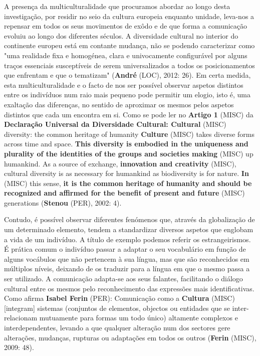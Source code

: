 \documentclass[12pt,a4paper]{article}
\begin{document}
A  presença  da  multiculturalidade  que  procuramos  abordar  ao  longo  desta investigação,  por  residir  no  seio  da  cultura  europeia  enquanto  unidade,  leva-nos  a repensar em todos os seus movimentos de exôdo e de que forma a comunicação evoluiu ao longo dos diferentes séculos. A diversidade cultural no interior do continente europeu está  em  contante  mudança,  não  se  podendo  caracterizar  como  "uma  realidade  fixa  e homogénea, clara e univocamente configurável por alguns traços essenciais susceptíveis de serem universalizados a todos os posicionamentos que enfrentam e que o tematizam" (\textbf{André} (LOC),  2012:  26).    Em  certa  medida,  esta  multiculturalidade  e  o  facto  de  nos  ser possível  observar  aspetos  distintos  entre  os  indivíduos  num  raio  mais  pequeno  pode permitir um  elogio, isto é, uma exaltação das diferenças, no sentido de aproximar os mesmos pelos aspetos distintos que cada um encontra em si. Como se pode ler no \textbf{Artigo 1} (MISC) da \textbf{Declaração Universal da Diversidade Cultural: Cultural} (MISC) diversity: the common heritage of humanity \textbf{Culture} (MISC) takes diverse forms across time and space. \textbf{This diversity is embodied in the uniqueness and plurality of the identities of the groups and societies making} (MISC) up humankind. As a source of exchange, \textbf{innovation and creativity} (MISC), cultural diversity is as necessary for humankind as biodiversity is for nature. \textbf{In} (MISC) this sense, \textbf{it is the common heritage of humanity and should be recognized and affirmed for the benefit of present and future} (MISC) generations (\textbf{Stenou} (PER), 2002: 4).

Contudo, é possível observar diferentes fenómenos que, através da globalização de um determinado elemento, tendem a standardizar diversos aspetos que englobam a vida de um indivíduo. A título de exemplo podemos referir os estrangeirismos. É prática comum o indivíduo passar a adaptar o seu vocabulário em função de alguns vocábulos que  não  pertencem  à  sua  língua,  mas  que  são  reconhecidos  em  múltiplos  níveis, deixando  de  os  traduzir  para  a  língua  em  que  o  mesmo  passa  a  ser  utilizado.  A comunicação adapta-se aos seus falantes, facilitando o diálogo cultural entre os mesmos pelo reconhecimento das expressões mais identificativas. Como afirma \textbf{Isabel Ferin} (PER): Comunicação como a \textbf{Cultura} (MISC) [integram] sistemas (conjuntos de elementos, objectos ou entidades  que  se  inter-relacionam  mutuamente  para  formas  um  todo  único)  altamente complexos e interdependentes, levando a que qualquer alteração num dos sectores gere alterações, mudanças, rupturas ou adaptações em todos os outros (\textbf{Ferin} (MISC), 2009: 48).
\end{document}
